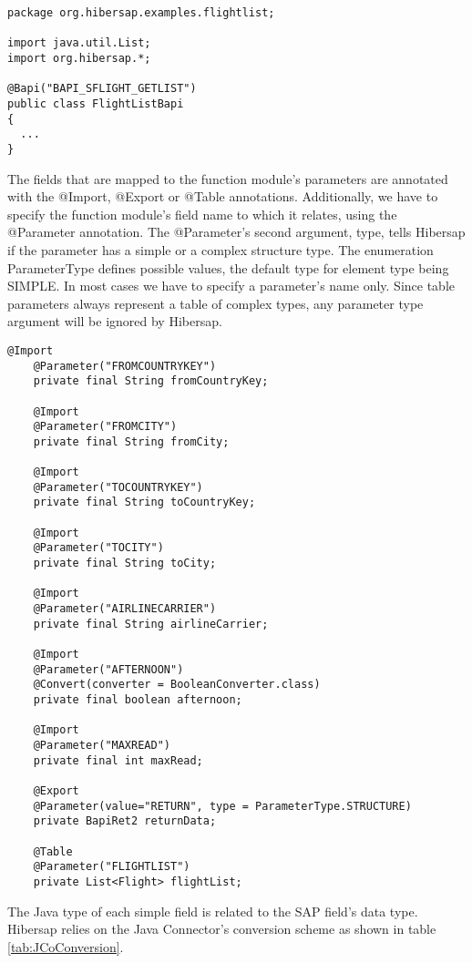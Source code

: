\begin{Verbatim}[frame=single,label=The BAPI class]
package org.hibersap.examples.flightlist;

import java.util.List;
import org.hibersap.*;

@Bapi("BAPI_SFLIGHT_GETLIST")
public class FlightListBapi
{
  ...
}
\end{Verbatim}

The fields that are mapped to the function module's parameters are annotated with the
@Import, @Export or @Table annotations.
Additionally, we have to specify the function module's field name
to which it relates, using the @Parameter annotation.
The @Parameter's second argument, type, tells Hibersap if the parameter has a simple or a complex structure type.
The enumeration ParameterType defines possible values, the default type for element type being SIMPLE.
In most cases we have to specify a parameter's name only. Since table parameters always represent
a table of complex types, any parameter type argument will be ignored by Hibersap.

\begin{Verbatim}[frame=single,label=The BAPI fields]
    @Import
    @Parameter("FROMCOUNTRYKEY")
    private final String fromCountryKey;

    @Import
    @Parameter("FROMCITY")
    private final String fromCity;

    @Import
    @Parameter("TOCOUNTRYKEY")
    private final String toCountryKey;

    @Import
    @Parameter("TOCITY")
    private final String toCity;

    @Import
    @Parameter("AIRLINECARRIER")
    private final String airlineCarrier;

    @Import
    @Parameter("AFTERNOON")
    @Convert(converter = BooleanConverter.class)
    private final boolean afternoon;

    @Import
    @Parameter("MAXREAD")
    private final int maxRead;

    @Export
    @Parameter(value="RETURN", type = ParameterType.STRUCTURE)
    private BapiRet2 returnData;

    @Table
    @Parameter("FLIGHTLIST")
    private List<Flight> flightList;
\end{Verbatim}

The Java type of each simple field is related to the SAP field's data type.
Hibersap relies on the Java Connector's conversion scheme as shown in table \ref{tab:JCoConversion}.

